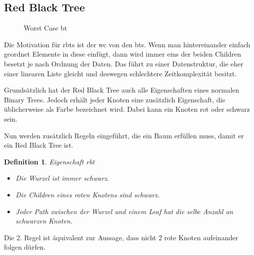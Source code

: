 \documentclass[11pt]{article}
\newtheorem{definition}{Definition}
\begin{document}
\subsection{Red Black Tree}

\begin{figure}
  \centering
\caption{Worst Case \gls{bt}}
\vspace{-50pt}
\end{figure}

Die Motivation für \glspl{rbt} ist der \gls{wc} von den \glspl{bt}. 
Wenn man hintereinander einfach geordnet Elemente in diese einfügt, dann wird immer eins der beiden Children besetzt je nach Ordnung der Daten.
Das führt zu einer Datenstruktur, die eher einer linearen Liste gleicht und deswegen schlechtere Zeitkomplexität besitzt.

Grundsätzlich hat der Red Black Tree auch alle Eigenschaften eines normalen Binary Trees. Jedoch erhält jeder Knoten eine zusätzlich Eigenschaft, die üblicherweise als Farbe bezeichnet wird.
Dabei kann ein Knoten rot oder schwarz sein.

Nun werden zusätzlich Regeln eingeführt, die ein Baum erfüllen muss, damit er ein Red Black Tree ist.

\begin{definition}{Eigenschaft \gls{rbt}}
  
\begin{itemize}
  \item[1.] Die Wurzel ist immer schwarz.
  \item[2.] Die Children eines roten Knotens sind schwarz.
  \item[3.] Jeder Path zwischen der Wurzel und einem Leaf hat die selbe Anzahl an schwarzen Knoten. 
\end{itemize}

\end{definition}

Die 2. Regel ist äquivalent zur Aussage, dass nicht 2 rote Knoten aufeinander folgen dürfen. \cite[S. 220f]{aic} 
\end{document}
